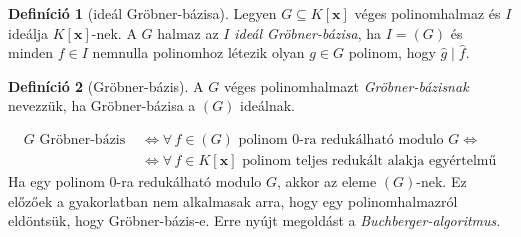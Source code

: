 \documentclass[DIV=15,appendixprefix]{scrreprt}
\theoremstyle{definition}
\newtheorem*{defin}{Definíció}
\theoremstyle{remark}
\begin{document}
%
\begin{defin}[ideál Gröbner-bázisa]
	Legyen $ G \subseteq K \left[ \mathbf{ x } \right] $ véges polinomhalmaz és $ I $ ideálja
	$ K \left[ \mathbf{ x } \right] $-nek. A $ G $ halmaz az $ I $ \emph{ideál Gröbner-bázisa}, ha
	$ I = \left( G \right) $ és minden $ f \in I $ nemnulla polinomhoz létezik olyan $ g \in G $
	polinom, hogy $ \hat{ g } \mid \hat{ f } $.
\end{defin}
\begin{defin}[Gröbner-bázis]
	A $ G $ véges polinomhalmazt \emph{Gröbner-bázisnak} nevezzük, ha Gröbner-bázisa a $ \left( G
	\right) $ ideálnak.
\end{defin}
\begin{equation*}
	\begin{split}
		G \text{ Gröbner-bázis } &\Leftrightarrow \forall \, f \in \left( G \right) \text{ polinom
		0-ra redukálható modulo } G \Leftrightarrow\\
		&\Leftrightarrow \forall \, f\in K \left[ \mathbf{ x } \right]
		\text{ polinom teljes redukált alakja egyértelmű}
	\end{split}
\end{equation*}
Ha egy polinom 0-ra redukálható modulo $ G $, akkor az eleme $ \left( G \right) $-nek.
%
Ez előzőek a gyakorlatban nem alkalmasak arra, hogy egy polinomhalmazról eldöntsük, hogy
Gröbner-bázis-e. Erre nyújt megoldást a \emph{Buchberger-algoritmus}.
\end{document}
